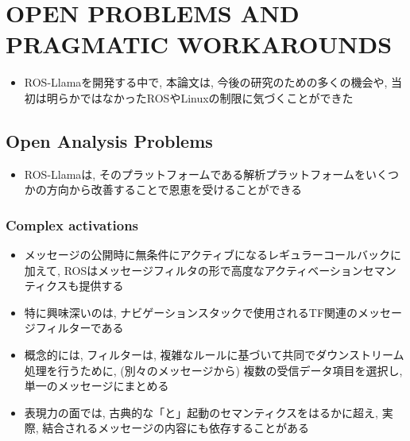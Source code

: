 
\section{OPEN PROBLEMS AND PRAGMATIC WORKAROUNDS}
\label{sec: open problems and pragmatic workarounds}

\begin{frame}{}
    \begin{itemize}
        \item ROS-Llamaを開発する中で, 本論文は, 今後の研究のための多くの機会や, 当初は明らかではなかったROSやLinuxの制限に気づくことができた
    \end{itemize}
\end{frame}


\subsection{Open Analysis Problems}
\label{ssec: open analysis problems}

\begin{frame}{}
    \begin{itemize}
        \item ROS-Llamaは, そのプラットフォームである解析プラットフォームをいくつかの方向から改善することで恩恵を受けることができる
    \end{itemize}
\end{frame}


\subsubsection{Complex activations}
\label{sssec: complex activations}

\begin{frame}{}
    \begin{itemize}
        \item メッセージの公開時に無条件にアクティブになるレギュラーコールバックに加えて, ROSはメッセージフィルタの形で高度なアクティベーションセマンティクスも提供する
        \item 特に興味深いのは, ナビゲーションスタックで使用されるTF関連のメッセージフィルターである
        \item 概念的には, フィルターは, 複雑なルールに基づいて共同でダウンストリーム処理を行うために,  (別々のメッセージから) 複数の受信データ項目を選択し, 単一のメッセージにまとめる
        \item 表現力の面では, 古典的な「と」起動のセマンティクスをはるかに超え, 実際, 結合されるメッセージの内容にも依存することがある
    \end{itemize}
\end{frame}

